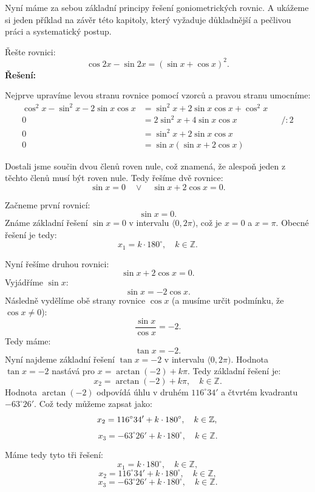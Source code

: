 \documentclass[12pt,a4paper]{article}
\begin{document}
Nyní máme za sebou základní principy řešení goniometrických rovnic.
A ukážeme si jeden příklad na závěr této kapitoly, 
který vyžaduje důkladnější a pečlivou práci a systematický postup.

\begin{examplebox}
    Řešte rovnici:
    \[
    \cos 2x - \sin 2x = \left(\sin x + \cos x\right)^2.
    \]
    \medskip
    \textbf{Řešení:}

    Nejprve upravíme levou stranu rovnice pomocí vzorců a pravou stranu umocníme:
    \[
    \begin{aligned}
        \cos^2 x - \sin^2 x - 2\sin x \cos x &= \sin^2 x + 2\sin x \cos x + \cos^2 x \\[0.5em]
        0 &= 2\sin^2 x + 4\sin x \cos x  && \big/ : 2 \\[0.5em]
        0 &= \sin^2 x + 2\sin x \cos x \\[0.5em]
        0 &= \sin x (\sin x + 2\cos x)
    \end{aligned}
    \]

    Dostali jsme součin dvou členů roven nule, což znamená, že alespoň jeden z těchto členů musí být roven nule.
    Tedy řešíme dvě rovnice:
    \[
    \sin x = 0  \quad \vee  \quad \sin x + 2\cos x = 0.
    \]

    Začneme první rovnicí:
    \[
    \sin x = 0.
    \]
    Známe základní řešení $\sin x = 0$ v intervalu $\langle 0, 2\pi)$, což je $x = 0$ a $x = \pi$.
    Obecné řešení je tedy:
    \[
    x_1 = k \cdot 180^\circ, \quad k \in \mathbb{Z}.
    \]

    \medskip
    Nyní řešíme druhou rovnici:
    \[
    \sin x + 2\cos x = 0.
    \]
    Vyjádříme $\sin x$:
    \[
    \sin x = -2\cos x.
    \]
    Následně vydělíme obě strany rovnice $\cos x$ (a musíme určit podmínku, že $\cos x \neq 0$):
    \[
    \frac{\sin x}{\cos x} = -2.
    \]
    Tedy máme:
    \[
    \tan x = -2.
    \]
    Nyní najdeme základní řešení $\tan x = -2$ v intervalu $\langle 0, 2\pi)$.
    Hodnota $\tan x = -2$ nastává pro $x = \arctan(-2) + k\pi$.
    Tedy základní řešení je:
    \[
    x_2 = \arctan(-2) + k\pi, \quad k \in \mathbb{Z}.
    \]
    Hodnota $\arctan(-2)$ odpovídá úhlu v druhém $116^\circ 34'$ a čtvrtém kvadrantu $-63^\circ 26'$.
    \medskip
    Což tedy můžeme zapsat jako:
    \[
    x_2 = 116^\circ 34' + k\cdot 180^\circ, \quad k \in \mathbb{Z}, \\
    \]
    \[
    x_3 = -63^\circ 26' + k\cdot 180^\circ, \quad k \in \mathbb{Z}.
    \]

    \medskip
    Máme tedy tyto tři řešení:
    \[
    x_1 = k \cdot 180^\circ, \quad k \in \mathbb{Z},
    \]
    \[
    x_2 = 116^\circ 34' + k\cdot 180^\circ, \quad k \in \mathbb{Z},
    \]
    \[
    x_3 = -63^\circ 26' + k\cdot 180^\circ, \quad k \in \mathbb{Z}.
    \]



\end{examplebox}
\end{document}
